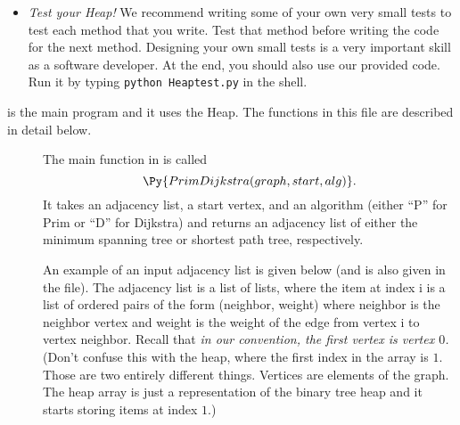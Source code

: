 \documentclass{ks-pset}
\begin{document}
\begin{problem}[\Py{PrimDijkstra}, 65]
\begin{description}
\begin{itemize}
        \item \emph{Test your Heap!} We recommend writing some of your own very
          small tests to test each method that you write. Test that method
          before writing the code for the next method. Designing your own small
          tests is a very important skill as a software developer. At the end,
          you should also use our provided  code. Run it by
          typing \texttt{python Heaptest.py} in the shell.

      \end{itemize}

    \item[\Ident{PrimDijkstra.py}]  is the main program
      and it uses the Heap. The functions in this file are described in detail
      below.

      \begin{description}
        \item[] The main function in
           is called
          \[
            \Py{PrimDijkstra(graph, start, alg)}.
          \]
          It takes an adjacency list, a start vertex, and an algorithm (either
          ``P'' for Prim or ``D'' for Dijkstra) and returns an adjacency list
          of either the minimum spanning tree or shortest path tree,
          respectively.

          An example of an input adjacency list is given below (and is also
          given in the  file). The adjacency list is a
          list of lists, where the item at index i is a list of ordered pairs
          of the form (neighbor, weight) where neighbor is the neighbor vertex
          and weight is the weight of the edge from vertex i to vertex
          neighbor. Recall that \emph{in our convention, the first vertex is
          vertex \(0\).}  (Don't confuse this with the heap, where the first
          index in the array is \(1\).  Those are two entirely different
          things.  Vertices are elements of the graph.  The heap array is just
          a representation of the binary tree heap and it starts storing items
          at index \(1\).)

          \inputminted{python}{template/02-graph1.py}

\end{description}
\end{description}
\end{problem}
\end{document}
